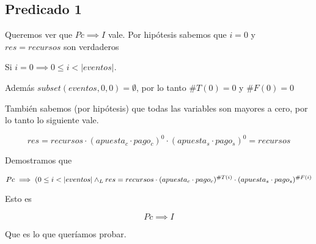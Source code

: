 \documentclass[../document.tex]{subfiles}
\begin{document}
\subsection*{Predicado 1}
Queremos ver que $Pc\implies I$ vale. Por hipótesis sabemos que $i=0$ y $res=recursos$ son verdaderos

Si $i=0 \implies 0\leq i < |eventos|$. 

Además $subset(eventos,0,0)=\emptyset$, por lo tanto $\#T(0)=0$ y $\#F(0)=0$

También sabemos (por hipótesis) que todas las variables son mayores a cero, por lo tanto lo siguiente vale.

\begin{equation}
res=recursos\cdot(apuesta_c\cdot pago_c)^0\cdot (apuesta_s\cdot pago_s)^0=recursos
\end{equation}

Demostramos que

\begin{equation}
Pc\implies (0\leq i < |eventos| \land _L res=recursos\cdot(apuesta_c\cdot pago_c)^{\#T(i)}\cdot (apuesta_s\cdot pago_s)^{\#F(i)}
\end{equation}

Esto es

\begin{equation}
Pc\implies I
\end{equation}

Que es lo que queríamos probar.








\end{document}
